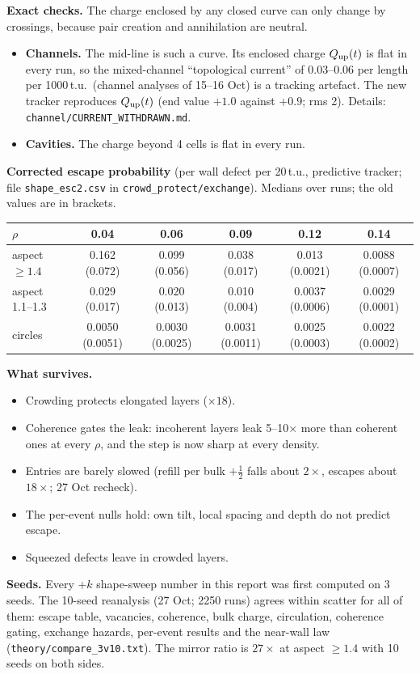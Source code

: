\documentclass[11pt,a4paper]{article}
\newcommand{\half}{\tfrac12}
\begin{document}
\textbf{Exact checks.} The charge enclosed by any closed curve can only change by crossings, because pair creation and annihilation are neutral.
\begin{itemize}
\item \textbf{Channels.} The mid-line is such a curve. Its enclosed charge $Q_{\rm up}(t)$ is flat in every run, so the mixed-channel ``topological current'' of 0.03--0.06 per length per 1000\,t.u.\ (channel analyses of 15--16 Oct) is a tracking artefact. The new tracker reproduces $Q_{\rm up}(t)$ (end value $+1.0$ against $+0.9$; rms 2). Details: \texttt{channel/CURRENT\_WITHDRAWN.md}.
\item \textbf{Cavities.} The charge beyond 4 cells is flat in every run.
\end{itemize}

\textbf{Corrected escape probability} (per wall defect per 20\,t.u., predictive tracker; file \texttt{shape\_esc2.csv} in \texttt{crowd\_protect/exchange}). Medians over runs; the old values are in brackets.
\begin{center}\begin{tabular}{lccccc}\toprule
$\rho$ & 0.04 & 0.06 & 0.09 & 0.12 & 0.14\\\midrule
aspect $\geq1.4$ & 0.162 (0.072) & 0.099 (0.056) & 0.038 (0.017) & 0.013 (0.0021) & 0.0088 (0.0007)\\
aspect 1.1--1.3 & 0.029 (0.017) & 0.020 (0.013) & 0.010 (0.004) & 0.0037 (0.0006) & 0.0029 (0.0001)\\
circles & 0.0050 (0.0051) & 0.0030 (0.0025) & 0.0031 (0.0011) & 0.0025 (0.0003) & 0.0022 (0.0002)\\\bottomrule
\end{tabular}\end{center}
\textbf{What survives.}
\begin{itemize}
\item Crowding protects elongated layers ($\times18$).
\item Coherence gates the leak: incoherent layers leak 5--10$\times$ more than coherent ones at every $\rho$, and the step is now sharp at every density.
\item Entries are barely slowed (refill per bulk $+\half$ falls about $2\times$, escapes about $18\times$; 27 Oct recheck).
\item The per-event nulls hold: own tilt, local spacing and depth do not predict escape.
\item Squeezed defects leave in crowded layers.
\end{itemize}
\textbf{Seeds.} Every +$k$ shape-sweep number in this report was first computed on 3 seeds. The 10-seed reanalysis (27 Oct; 2250 runs) agrees within scatter for all of them: escape table, vacancies, coherence, bulk charge, circulation, coherence gating, exchange hazards, per-event results and the near-wall law (\texttt{theory/compare\_3v10.txt}). The mirror ratio is $27\times$ at aspect $\geq1.4$ with 10 seeds on both sides.
\end{document}
